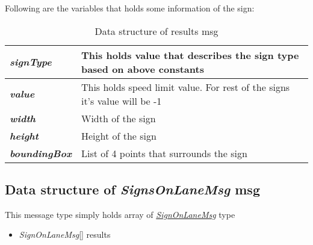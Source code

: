 Following are the variables that holds some information of the sign:
\begin{table}[h!]
\centering
\begin{tabular}{ | m{3cm} | p{12cm} | } 
\hline
\textbf{\emph{signType}} & This holds value that describes the sign type based on above constants\\ 
\hline
\textbf{\emph{value}} & This holds speed limit value. For rest of the signs it's value will be -1\\ 
\hline
\textbf{\emph{width}} & Width of the sign\\ 
\hline
\textbf{\emph{height}} & Height of the sign\\
\hline
\textbf{\emph{boundingBox}} & List of 4 points that surrounds the sign\\
\hline
\end{tabular}
\caption{Data structure of results msg}
\label{table:ResultDataStructure}
\end{table}

\subsection{Data structure of \emph{SignsOnLaneMsg} msg}
This message type simply holds array of \hyperlink{sec:DataStructureSignOnLane}{\emph{SignOnLaneMsg}} type
\begin{itemize}
    \item \emph{SignOnLaneMsg}[] results
\end{itemize}